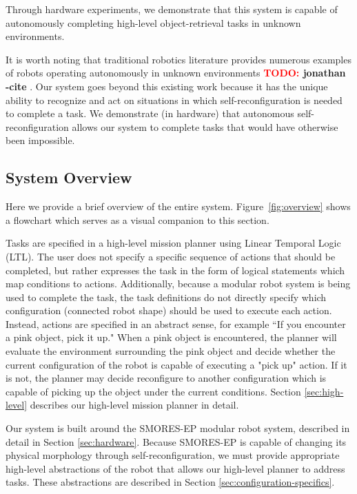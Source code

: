 \documentclass[conference]{IEEEtran}
\newcommand{\TODO}[1]{ {\bf \textcolor{red}{TODO:} #1 }}
\begin{document}
Through hardware experiments, we demonstrate that this system is capable of autonomously completing high-level object-retrieval tasks in unknown environments.

It is worth noting that traditional robotics literature provides numerous examples of robots operating
autonomously in unknown environments \TODO{jonathan -cite}. Our system goes
beyond this existing work because it has the unique ability to recognize and
act on situations in which self-reconfiguration is needed to complete a task.
 We demonstrate (in hardware) that autonomous self-reconfiguration allows our system to complete tasks that would have otherwise been impossible.
%
\subsection{System Overview}
%
Here we provide a brief overview of the entire system.  Figure~\ref{fig:overview} shows a flowchart which serves as a visual companion to this section. 

Tasks are specified in a high-level mission planner using Linear Temporal Logic (LTL). The user does not specify a specific sequence of actions that should be completed, but rather expresses the task in the form of logical statements which map conditions to actions. Additionally, because a modular robot system is being used to complete the task, the task definitions do not directly specify which configuration (connected robot shape) should be used to execute each action. Instead, actions are specified in an abstract sense, for example ``If you encounter a pink object, pick it up." When a pink object is encountered, the planner will evaluate the environment surrounding the pink object and decide whether the current configuration of the robot is capable of executing a "pick up" action.  If it is not, the planner may decide reconfigure to another configuration which is capable of picking up the object under the current conditions.  Section \ref{sec:high-level} describes our high-level mission planner in detail.

Our system is built around the SMORES-EP modular robot system, described in detail in Section \ref{sec:hardware}. Because SMORES-EP is capable of changing its physical morphology through self-reconfiguration, we must provide appropriate high-level abstractions of the robot that allows our high-level planner to address tasks.  These abstractions are described in Section \ref{sec:configuration-specifics}.
\end{document}

